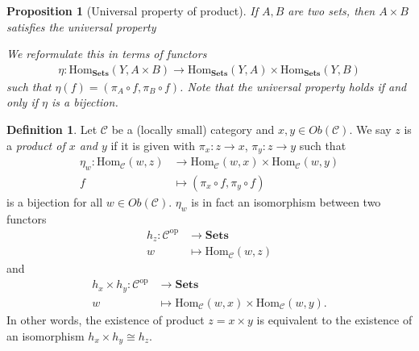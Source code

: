 \documentclass[12pt]{report}
\theoremstyle{plain}
\newtheorem{proposition}[theorem]{Proposition}
\theoremstyle{remark}
\theoremstyle{definition}
\newtheorem{definition}[theorem]{Definition}
\newcommand{\Hom}[3]{\mathrm{Hom}_{#3}(#1,#2)}
\begin{document}
\begin{proposition}[Universal property of product]
    If $A,B$ are two sets, then $A\times B$ satisfies the universal property
    \begin{figure}[H]
    \centering
    \end{figure}
    \noindent We reformulate this in terms of functors
    \begin{align*}
        \eta:\mathrm{Hom}_\mathbf{Sets}(Y,A\times B)\rightarrow \mathrm{Hom}_\mathbf{Sets}(Y,A)\times \mathrm{Hom}_\mathbf{Sets}(Y,B)
    \end{align*}
    such that $\eta(f) = (\pi_A\circ f,\pi_B\circ f)$. Note that the universal property holds if and only if $\eta$ is a bijection.
\end{proposition}

\begin{definition}
    Let $\mathcal{C}$ be a (locally small) category and $x,y\in Ob(\mathcal{C})$. We say $z$ is a \emph{product of $x$ and $y$} if it is given with $\pi_x:z\rightarrow x$, $\pi_y:z\rightarrow y$ such that
    \begin{align*}
        \eta_w : \mathrm{Hom}_\mathcal{C}(w,z) &\rightarrow\mathrm{Hom}_\mathcal{C}(w,x)\times\mathrm{Hom}_\mathcal{C}(w,y) \\
        f &\mapsto (\pi_x \circ f, \pi_y \circ f) 
    \end{align*}
    is a bijection for all $w\in Ob(\mathcal{C})$. $\eta_w$ is in fact an isomorphism between two functors
    \begin{align*}
        h_z:\mathcal{C}^\mathrm{op} &\rightarrow \mathbf{Sets} \\
        w &\mapsto \Hom{w}{z}{\mathcal{C}}
    \end{align*}
    and
    \begin{align*}
        h_x\times h_y : \mathcal{C}^\mathrm{op} &\rightarrow \mathbf{Sets} \\
        w &\mapsto \Hom{w}{x}{\mathcal{C}} \times \Hom{w}{y}{\mathcal{C}}.
    \end{align*}
    In other words, the existence of product $z=x\times y$ is equivalent to the existence of an isomorphism $h_x\times h_y \cong h_z$.
\end{definition}
\end{document}
